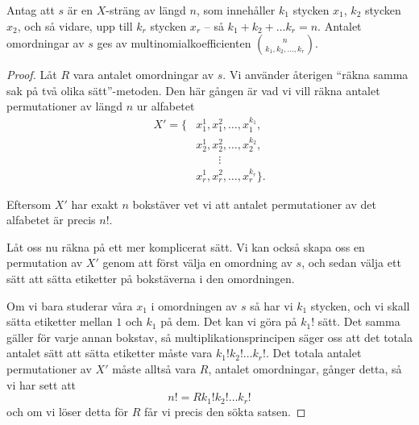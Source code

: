 \documentclass[nobib]{tufte-handout}
\begin{document}
\begin{proposition}
  Antag att $s$ är en $X$-sträng av längd $n$, som innehåller $k_1$ stycken $x_1$, $k_2$ stycken $x_2$, och så vidare, upp till $k_r$ stycken $x_r$ -- så $k_1 + k_2 + \ldots k_r = n$. Antalet omordningar av $s$ ges av multinomialkoefficienten $\binom{n}{k_1, k_2, \ldots, k_r}$.

  \begin{proof}
    Låt $R$ vara antalet omordningar av $s$. Vi använder återigen ``räkna samma sak på två olika sätt''-metoden. Den här gången är vad vi vill räkna antalet permutationer av längd $n$ ur alfabetet
    \begin{align*}
      X' = \{&x_1^1, x_1^2, \ldots, x_1^{k_1},\\
             &x_2^1, x_2^2, \ldots, x_2^{k_2},\\
             &\qquad\vdots\\
             &x_r^1, x_r^2, \ldots, x_r^{k_r}\}.
    \end{align*}

    Eftersom $X'$ har exakt $n$ bokstäver vet vi att antalet permutationer av det alfabetet är precis $n!$.

    Låt oss nu räkna på ett mer komplicerat sätt. Vi kan också skapa oss en permutation av $X'$ genom att först välja en omordning av $s$, och sedan välja ett sätt att sätta etiketter på bokstäverna i den omordningen.

    Om vi bara studerar våra $x_1$ i omordningen av $s$ så har vi $k_1$ stycken, och vi skall sätta etiketter mellan $1$ och $k_1$ på dem. Det kan vi göra på $k_1!$ sätt. Det samma gäller för varje annan bokstav, så multiplikationsprincipen säger oss att det totala antalet sätt att sätta etiketter måste vara $k_1!k_2!\ldots k_r!$. Det totala antalet permutationer av $X'$ måste alltså vara $R$, antalet omordningar, gånger detta, så vi har sett att 
    $$n! = Rk_1!k_2!\ldots k_r!$$
    och om vi löser detta för $R$ får vi precis den sökta satsen.
  \end{proof}
\end{proposition}
\end{document}
